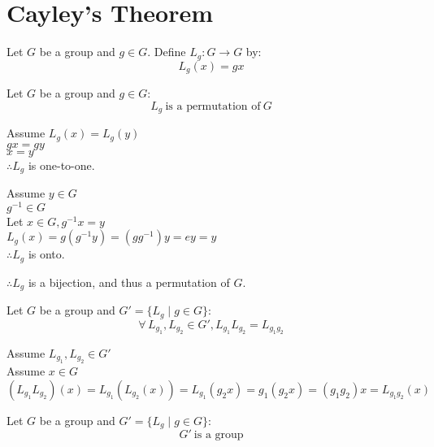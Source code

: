 \documentclass[letterpaper,12pt,fleqn]{article}
\begin{document}
\section*{Cayley's Theorem}

\begin{definition}
  Let $G$ be a group and $g\in G$. Define $L_g:G\to G$ by:
  \[L_g(x)=gx\]
\end{definition}

\begin{lemma}
  Let $G$ be a group and $g\in G$:
  \[L_g\ \mbox{is a permutation of}\ G\]
\end{lemma}

\begin{theproof}
  Assume $L_g(x)=L_g(y)$ \\
  $gx=gy$ \\
  $x=y$ \\
  $\therefore L_g$ is one-to-one.

  Assume $y\in G$ \\
  $g^{-1}\in G$ \\
  Let $x\in G,g^{-1}x=y$ \\
  $L_g(x)=g(g^{-1}y)=(gg^{-1})y=ey=y$ \\
  $\therefore L_g$ is onto.

  $\therefore L_g$ is a bijection, and thus a permutation of $G$.
\end{theproof}

\begin{lemma} 
  Let $G$ be a group and $G'=\{L_g\mid g\in G\}$:
  \[\forall\,L_{g_1},L_{g_2}\in G',L_{g_1}L_{g_2}=L_{g_1g_2}\]
\end{lemma}

\begin{theproof}
  Assume $L_{g_1},L_{g_2}\in G'$ \\
  Assume $x\in G$ \\
  $(L_{g_1}L_{g_2})(x)=L_{g_1}(L_{g_2}(x))=L_{g_1}(g_2x)=g_1(g_2x)=(g_1g_2)x=
  L_{g_1g_2}(x)$
\end{theproof}

\begin{lemma}
  Let $G$ be a group and $G'=\{L_g\mid g\in G\}$:
  \[G'\ \mbox{is a group}\]
\end{lemma}
\end{document}
